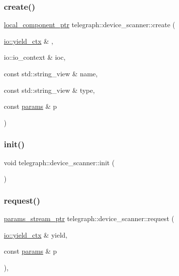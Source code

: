 \subsubsection{\texorpdfstring{create()}{create()}}
{\footnotesize\ttfamily \hyperlink{namespacetelegraph_a69cfb42be07c9189123cfa3ff3ec4487}{local\+\_\+component\+\_\+ptr} telegraph\+::device\+\_\+scanner\+::create (\begin{DoxyParamCaption}\item[{\hyperlink{structboost_1_1asio_1_1yield__ctx}{io\+::yield\+\_\+ctx} \&}]{,  }\item[{io\+::io\+\_\+context \&}]{ioc,  }\item[{const std\+::string\+\_\+view \&}]{name,  }\item[{const std\+::string\+\_\+view \&}]{type,  }\item[{const \hyperlink{classtelegraph_1_1params}{params} \&}]{p }\end{DoxyParamCaption})\hspace{0.3cm}{\ttfamily [static]}}

\mbox{\label{classtelegraph_1_1device__scanner_a71be73d87ccb72b5311ad19aab16c1c7}} 
\subsubsection{\texorpdfstring{init()}{init()}}
{\footnotesize\ttfamily void telegraph\+::device\+\_\+scanner\+::init (\begin{DoxyParamCaption}{ }\end{DoxyParamCaption})}

\mbox{\label{classtelegraph_1_1device__scanner_a5873278cb04e50896c3f125639df4c73}} 
\subsubsection{\texorpdfstring{request()}{request()}}
{\footnotesize\ttfamily \hyperlink{namespacetelegraph_ad071241508ea0f86c7de0686016f9ca9}{params\+\_\+stream\+\_\+ptr} telegraph\+::device\+\_\+scanner\+::request (\begin{DoxyParamCaption}\item[{\hyperlink{structboost_1_1asio_1_1yield__ctx}{io\+::yield\+\_\+ctx} \&}]{yield,  }\item[{const \hyperlink{classtelegraph_1_1params}{params} \&}]{p }\end{DoxyParamCaption})\hspace{0.3cm}{\ttfamily [override]}, {\ttfamily [virtual]}}



